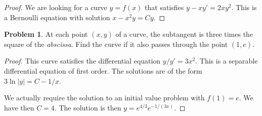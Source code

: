 \documentclass{scrartcl}
\theoremstyle{definition}
\newtheorem*{problem*}{Problem}
\begin{document}
\begin{proof}
We are looking for a curve $y=f(x)$ that satisfies $y-xy'=2xy^2$.
This is a Bernoulli equation with solution $x-x^2y=Cy$. 
\end{proof}

\begin{problem*}
At each point $(x,y)$ of a curve, the subtangent is three times the
square of the \emph{abscissa}.  Find the curve if it also passes
through the point $(1,e)$. 
\end{problem*}

\begin{center}
\end{center}


\begin{proof}
This curve satisfies the differential equation $y/y'=3x^2$.  This is a
separable differential equation of first order.  The solutions are of
the form $3\ln \lvert y \rvert = C- 1/x$. 

We actually require the solution to an initial value problem with $f(1)=e$.  We
have then $C=4$.  The solution is then $y = e^{4/3}e^{-1/(3x)}$.
\end{proof}
\end{document}
